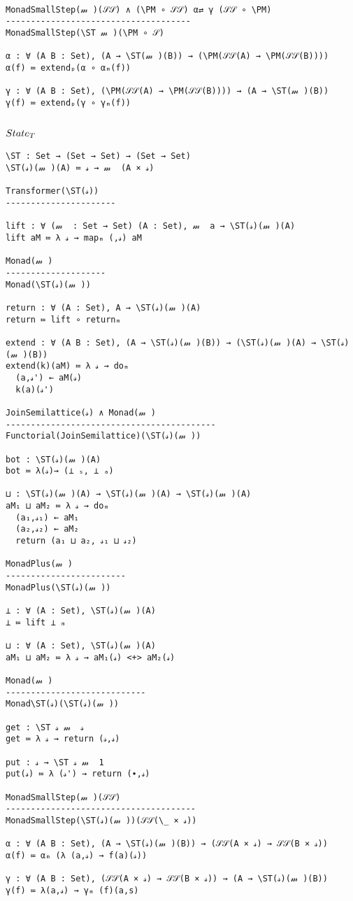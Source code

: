 \documentclass{article}
\begin{document}
\begin{verbatim}

MonadSmallStep(𝓂 )(𝒮𝒮) ∧ (\PM ∘ 𝒮𝒮) α⇄ γ (𝒮𝒮 ∘ \PM)
-------------------------------------
MonadSmallStep(\ST 𝓂 )(\PM ∘ 𝒮)

α : ∀ (A B : Set), (A → \ST(𝓂 )(B)) → (\PM(𝒮𝒮(A) → \PM(𝒮𝒮(B))))
α(f) ≔ extendₚ(α ∘ αₘ(f))

γ : ∀ (A B : Set), (\PM(𝒮𝒮(A) → \PM(𝒮𝒮(B)))) → (A → \ST(𝓂 )(B))
γ(f) ≔ extendₚ(γ ∘ γₘ(f))
\end{verbatim}



\subsection{$State_T$}
\label{section:Proofs:StateT}

\begin{verbatim}
\ST : Set → (Set → Set) → (Set → Set)
\ST(𝓈)(𝓂 )(A) ≔ 𝓈 → 𝓂  (A × 𝓈)

Transformer(\ST(𝓈))
----------------------

lift : ∀ (𝓂  : Set → Set) (A : Set), 𝓂  a → \ST(𝓈)(𝓂 )(A)
lift aM ≔ λ 𝓈 → mapₘ (,𝓈) aM

Monad(𝓂 )
--------------------
Monad(\ST(𝓈)(𝓂 ))

return : ∀ (A : Set), A → \ST(𝓈)(𝓂 )(A)
return ≔ lift ∘ returnₘ

extend : ∀ (A B : Set), (A → \ST(𝓈)(𝓂 )(B)) → (\ST(𝓈)(𝓂 )(A) → \ST(𝓈)(𝓂 )(B))
extend(k)(aM) ≔ λ 𝓈 → doₘ
  (a,𝓈') ← aM(𝓈)
  k(a)(𝓈')

JoinSemilattice(𝓈) ∧ Monad(𝓂 )
------------------------------------------
Functorial(JoinSemilattice)(\ST(𝓈)(𝓂 ))

bot : \ST(𝓈)(𝓂 )(A)
bot ≔ λ(𝓈)→ (⊥ ₛ, ⊥ ₐ)

⊔ : \ST(𝓈)(𝓂 )(A) → \ST(𝓈)(𝓂 )(A) → \ST(𝓈)(𝓂 )(A)
aM₁ ⊔ aM₂ ≔ λ 𝓈 → doₘ
  (a₁,𝓈₁) ← aM₁
  (a₂,𝓈₂) ← aM₂
  return (a₁ ⊔ a₂, 𝓈₁ ⊔ 𝓈₂)

MonadPlus(𝓂 )
------------------------
MonadPlus(\ST(𝓈)(𝓂 ))

⊥ : ∀ (A : Set), \ST(𝓈)(𝓂 )(A)
⊥ ≔ lift ⊥ ₘ

⊔ : ∀ (A : Set), \ST(𝓈)(𝓂 )(A)
aM₁ ⊔ aM₂ ≔ λ 𝓈 → aM₁(𝓈) <+> aM₂(𝓈)

Monad(𝓂 )
----------------------------
Monad\ST(𝓈)(\ST(𝓈)(𝓂 ))

get : \ST 𝓈 𝓂  𝓈
get ≔ λ 𝓈 → return (𝓈,𝓈)

put : 𝓈 → \ST 𝓈 𝓂  1
put(𝓈) ≔ λ (𝓈') → return (∙,𝓈)

MonadSmallStep(𝓂 )(𝒮𝒮)
--------------------------------------
MonadSmallStep(\ST(𝓈)(𝓂 ))(𝒮𝒮(\_ × 𝓈))

α : ∀ (A B : Set), (A → \ST(𝓈)(𝓂 )(B)) → (𝒮𝒮(A × 𝓈) → 𝒮𝒮(B × 𝓈))
α(f) ≔ αₘ (λ (a,𝓈) → f(a)(𝓈))

γ : ∀ (A B : Set), (𝒮𝒮(A × 𝓈) → 𝒮𝒮(B × 𝓈)) → (A → \ST(𝓈)(𝓂 )(B))
γ(f) ≔ λ(a,𝓈) → γₘ (f)(a,s)
\end{verbatim}



{}

\end{document}
